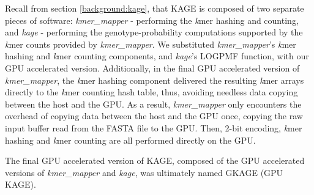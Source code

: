 Recall from section \ref{background:kage}, that KAGE is composed of two separate pieces of software: \textit{kmer\_mapper} - performing the \textit{k}mer hashing and counting, and \textit{kage} - performing the genotype-probability computations supported by the \textit{k}mer counts provided by \textit{kmer\_mapper}.
We substituted \textit{kmer\_mapper}'s \textit{k}mer hashing and \textit{k}mer counting components, and \textit{kage}'s LOGPMF function, with our GPU accelerated version.
Additionally, in the final GPU accelerated version of \textit{kmer\_mapper}, the \textit{k}mer hashing component delivered the resulting \textit{k}mer arrays directly to the \textit{k}mer counting hash table, thus, avoiding needless data copying between the host and the GPU.
As a result, \textit{kmer\_mapper} only encounters the overhead of copying data between the host and the GPU once, copying the raw input buffer read from the FASTA file to the GPU. 
Then, 2-bit encoding, \textit{k}mer hashing and \textit{k}mer counting are all performed directly on the GPU.

The final GPU accelerated version of KAGE, composed of the GPU accelerated versions of \textit{kmer\_mapper} and \textit{kage}, was ultimately named GKAGE (GPU KAGE).

